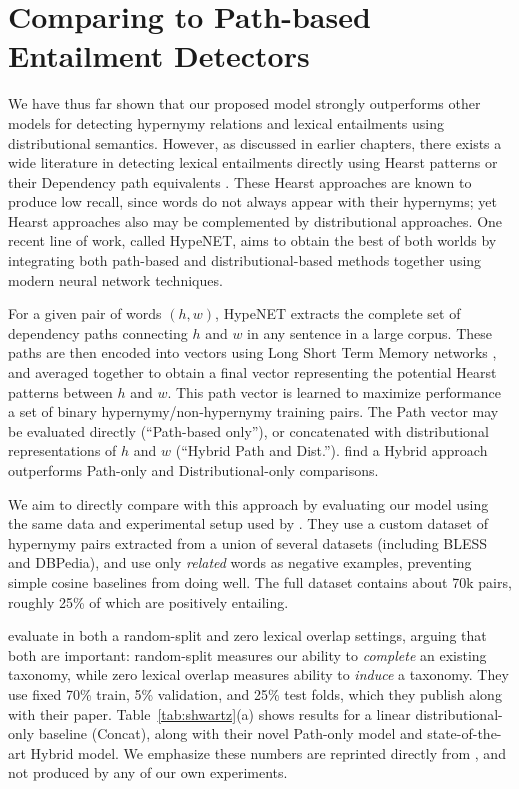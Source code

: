 \section{Comparing to Path-based Entailment Detectors}

We have thus far shown that our proposed model strongly outperforms other
models for detecting hypernymy relations and lexical entailments using
distributional semantics. However, as discussed in earlier chapters, there
exists a wide literature in detecting lexical entailments directly using
Hearst patterns \cite{hearst:1992:coling} or their Dependency path
equivalents \cite{snow:2004:nips,girju:2006:cl}. These Hearst approaches are
known to produce low recall, since words do not always appear with their
hypernyms; yet Hearst approaches also may be complemented by distributional
approaches.
One recent line of work, called HypeNET, aims to obtain the best of both
worlds by integrating both path-based and distributional-based methods together
using modern neural network techniques.

For a given pair of words $(h, w)$, HypeNET extracts the complete set of
dependency paths connecting $h$ and $w$ in any sentence in a large corpus.
These paths are then encoded into vectors using Long Short Term Memory networks
\cite{hochreiter:1997:nc}, and averaged together to obtain a final vector
representing the potential Hearst patterns between $h$ and $w$.  This path
vector is learned to maximize performance a set of binary
hypernymy/non-hypernymy training pairs. The Path vector may be evaluated
directly (``Path-based only''), or concatenated with distributional
representations of $h$ and $w$ (``Hybrid Path and Dist.'').
 find a Hybrid approach outperforms Path-only and
Distributional-only comparisons.

We aim to directly compare with this approach by evaluating our model using
the same data and experimental setup used by .
They use a custom dataset of hypernymy pairs extracted from a union of several
datasets (including BLESS and DBPedia), and use only {\em related} words
as negative examples, preventing simple cosine baselines from doing well.
The full dataset contains about 70k pairs, roughly 25\% of which are positively
entailing.

 evaluate in both a random-split and
zero lexical overlap settings, arguing that both are important: random-split
measures our ability to {\em complete} an existing taxonomy, while
zero lexical overlap measures ability to {\em induce} a taxonomy.
They use fixed 70\% train, 5\% validation, and 25\% test folds, which they
publish along with their paper.  Table~\ref{tab:shwartz}(a) shows
results for a linear distributional-only baseline (Concat), along with their
novel Path-only model and state-of-the-art Hybrid model. We emphasize these
numbers are reprinted directly from , and not
produced by any of our own experiments.

